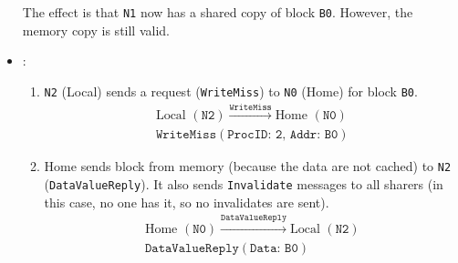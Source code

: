 \begin{itemize}
\begin{figure}[!htp]
    \end{figure}
    The effect is that \texttt{N1} now has a shared copy of block \texttt{B0}. However, the memory copy is still valid.


    \item {}:
    \begin{enumerate}
        \item \texttt{N2} (Local) sends a request (\texttt{WriteMiss}) to \texttt{N0} (Home) for block \texttt{B0}.
        \begin{gather*}
            \text{Local } (\texttt{N2}) \xrightarrow{\texttt{WriteMiss}} \text{Home } (\texttt{N0})
            \\[.3em]
            \texttt{WriteMiss}(\texttt{ProcID: 2, Addr: B0})
        \end{gather*}

        \item Home sends block from memory (because the data are not cached) to \texttt{N2} (\texttt{DataValueReply}). It also sends \texttt{Invalidate} messages to all sharers (in this case, no one has it, so no invalidates are sent).
        \begin{gather*}
            \text{Home } (\texttt{N0}) \xrightarrow{\texttt{DataValueReply}} \text{Local } (\texttt{N2})
            \\[.3em]
            \texttt{DataValueReply}(\texttt{Data: B0})
        \end{gather*}


\end{enumerate}
\end{itemize}

